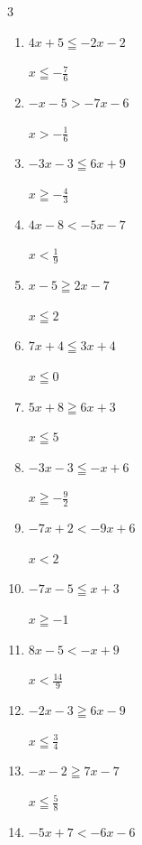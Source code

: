 \begin{multicols}{3}
\begin{enumerate}
        $\displaystyle x<-\frac{11}{5}$

  \item $4x+5\leqq -2x-2$

        $\displaystyle x\leqq -\frac{7}{6}$

  \item $-x-5>-7x-6$

        $\displaystyle x>-\frac{1}{6}$

  \item $-3x-3\leqq 6x+9$

        $\displaystyle x\geqq -\frac{4}{3}$

  \item $4x-8<-5x-7$

        $\displaystyle x<\frac{1}{9}$

  \item $x-5\geqq 2x-7$

        $\displaystyle x\leqq 2$

  \item $7x+4\leqq 3x+4$

        $\displaystyle x\leqq 0$

  \item $5x+8\geqq 6x+3$

        $\displaystyle x\leqq 5$

  \item $-3x-3\leqq -x+6$

        $\displaystyle x\geqq -\frac{9}{2}$

  \item $-7x+2<-9x+6$

        $\displaystyle x<2$

  \item $-7x-5\leqq x+3$

        $\displaystyle x\geqq -1$

\columnbreak %

  \item $8x-5<-x+9$

        $\displaystyle x<\frac{14}{9}$

  \item $-2x-3\geqq 6x-9$

        $\displaystyle x\leqq \frac{3}{4}$

  \item $-x-2\geqq 7x-7$

        $\displaystyle x\leqq \frac{5}{8}$

  \item $-5x+7<-6x-6$


\end{enumerate}
\end{multicols}

